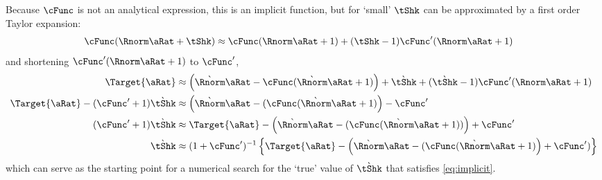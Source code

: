 \documentclass[\econtexRoot/BufferStockTheory.tex]{subfiles}
\begin{document}
\begin{comment}
  For any given current value $\pnt$ (and treating $\Nxt{\DnsShk}$ and $\Nxt{\Rnorm}=\Rfree (\PGro \Nxt{\DnsShk})^{-1}$ as predetermined).
  \begin{equation}\begin{gathered}\begin{aligned}
    \Target{\pnt}(\tShk) & = 
                           \Nxt{\Rnorm} \pnt + \Nxt{\tShk} - \cFunc(\Nxt{\Rnorm}\pnt+\Nxt{\tShk})
                           \label{eq:implicit}
  \end{aligned}\end{gathered}\end{equation}
\end{comment}
Because $\cFunc$ is not an analytical expression, this is an implicit function, but for `small' $\tShk$ can be approximated by
a first order Taylor expansion:
\begin{equation}\begin{gathered}\begin{aligned}
  \cFunc(\Rnorm \pnt + \tShk) & \approx   \cFunc(\Rnorm \pnt + 1)+ (\tShk-1)\cFunc^{\prime}(\Rnorm \pnt + 1)
\end{aligned}\end{gathered}\end{equation}
and shortening $\cFunc^{\prime}(\Rnorm \pnt + 1)$ to $\cFunc^{\prime}$,
\begin{equation}\begin{gathered}\begin{aligned}
  \Target{\pnt} & \approx \left(
                  \Nxt{\Rnorm} \pnt  - \cFunc(\Nxt{\Rnorm}\pnt+1)
                  \right)
                  +\Nxt{\tShk}+(\Nxt{\tShk}-1)\cFunc^{\prime}(\Rnorm \pnt + 1)
  \\ \Target{\pnt} -(\cFunc^{\prime}+1)\Nxt{\tShk} & \approx  \left(\Nxt{\Rnorm} \pnt  - (\cFunc(\Nxt{\Rnorm}\pnt+1)\right)-\cFunc^{\prime}
  \\  (\cFunc^{\prime}+1)\Nxt{\tShk} & \approx \Target{\pnt}- \left(\Nxt{\Rnorm} \pnt  - (\cFunc(\Nxt{\Rnorm}\pnt+1))\right)+\cFunc^{\prime}                                             \\  \Nxt{\tShk} & \approx  (1+\cFunc^{\prime})^{-1}\left\{\Target{\pnt}- \left(\Nxt{\Rnorm} \pnt  - (\cFunc(\Nxt{\Rnorm}\pnt+1)\right)+\cFunc^{\prime})\right\}
\end{aligned}\end{gathered}\end{equation}
which can serve as the starting point for a numerical search for the `true' value of $\Nxt{\tShk}$ that satisfies \eqref{eq:implicit}.
\end{document}
